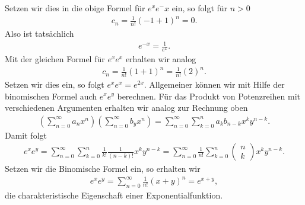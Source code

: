 \documentclass[letterpaper,10pt,english]{jupyterBook}
\begin{document}
Setzen wir dies in die obige Formel für \(e^x e^-x\) ein, so folgt für \(n > 0\)
\begin{equation*}
\begin{split}c_n = \frac{1}{n!}(-1+1)^n = 0 .\end{split}
\end{equation*}
Also ist tatsächlich
\begin{equation*}
\begin{split} e^{-x} = \frac{1}{e^x}.\end{split}
\end{equation*}
Mit der gleichen Formel für \(e^x e^x\) erhalten wir analog
\begin{equation*}
\begin{split} c_n = \frac{1}{n!}(1+1)^n =  \frac{1}{n!}(2)^n .\end{split}
\end{equation*}
Setzen wir dies ein, so folgt \(e^x e^x = e^{2x}\).
Allgemeiner können wir mit Hilfe der binomischen Formel auch \(e^x e^y\) berechnen. Für das Produkt von Potenzreihen mit verschiedenen Argumenten erhalten wir analog zur Rechnung oben
\begin{equation*}
\begin{split}\left( \sum_{n=0}^\infty  a_n x^n \right) \left( \sum_{n=0}^\infty b_y x^n \right) =
\sum_{n=0}^\infty \sum_{k=0}^n a_k b_{n-k} x^k y^{n-k}.\end{split}
\end{equation*}
Damit folgt
\begin{equation*}
\begin{split} e^x e^y = \sum_{n=0}^\infty \sum_{k=0}^n \frac{1}{k!} \frac{1}{(n-k)!} x^k y^{n-k} =
\sum_{n=0}^\infty \frac{1}{n!} \sum_{k=0}^n (\begin{matrix} n\\ k \end{matrix} )  x^k y^{n-k}.\end{split}
\end{equation*}
Setzen wir die Binomische Formel ein, so erhalten wir
\begin{equation*}
\begin{split} e^x e^y = \sum_{n=0}^\infty \frac{1}{n!}  (x+y)^n = e^{x+y},\end{split}
\end{equation*}
die charakteristische Eigenschaft einer Exponentialfunktion.
\end{document}
